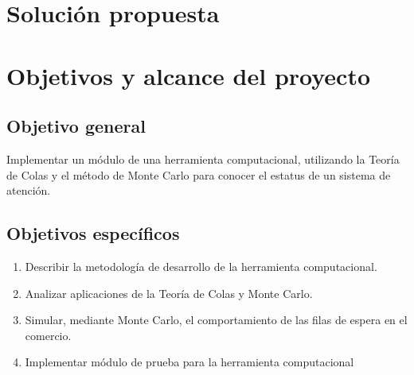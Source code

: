 \section{Soluci\'on propuesta}
\label{intro:solucion}
\begin{comment}
Físicamente, el Departamento permaneció en las dependencias del Departamento de Ingeniería Industrial hasta 1988, cuando fue trasladado para ocupar lo que fuera el Pabellón de Forja de la Escuela de Artes y Oficios, edificio que es monumento histórico.

Las nuevas dependencias incluían seis salas de laboratorio para docencia, tres laboratorios de investigación para uso de memoristas, cuatro salas de clases, una biblioteca especializada, un centro de operaciones más amplio y apto para las nuevas necesidades tecnológicas del Departamento, oficinas para profesores, administrativos y secretarias docentes para cada carrera. También tuvo baños para uso exclusivo de los miembros del Departamento.

Sin duda este fue el comienzo de una nueva etapa en la vida del Departamento. Su imagen al interior de la Facultad y de la Universidad creció y se potenció con la participación de algunos académicos en proyectos institucionales, como la Dirección de SEGIC y la instalación de una red de fibra óptica en todo el campus universitario.
\end{comment}



\section{Objetivos y alcance del proyecto}
\label{intro:objetivos}

\subsection{Objetivo general}
\noindent Implementar un módulo de una herramienta computacional, utilizando la Teoría de Colas y el método de Monte Carlo para conocer el estatus de un sistema de atención.

\subsection{Objetivos espec\'ificos}
\begin{enumerate}
	\item Describir la metodología de desarrollo de la herramienta computacional.
	\item Analizar aplicaciones de la Teoría de Colas y Monte Carlo.
	\item Simular, mediante Monte Carlo, el comportamiento de las filas de espera en el comercio.
	\item Implementar módulo de prueba para la herramienta computacional

\end{enumerate}


